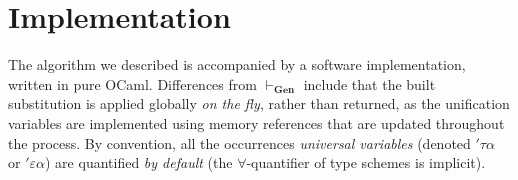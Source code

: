 \documentclass[declaration,shortabstract]{iithesis}
\theoremstyle{definition} \newtheorem{definition}{Definition}[section]
\begin{document}
\chapter{Implementation}
The algorithm we described is accompanied by a software implementation,
written in pure OCaml.
Differences from $\vdash_\textbf{Gen}$ include that the built substitution is
applied globally \textit{on the fly}, rather than returned,
as the unification variables are implemented using memory references that are updated throughout the process.
By convention, all the occurrences \textit{universal variables} (denoted $'\tau\alpha$
or $'\varepsilon\alpha$) are quantified \textit{by default}
(the $\forall$-quantifier of type schemes is implicit).

\end{document}
